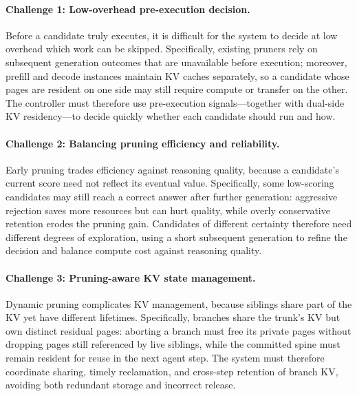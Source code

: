 \paragraph{Challenge 1: Low-overhead pre-execution decision.}
Before a candidate truly executes, it is difficult for the system to decide at low overhead which work can be skipped.
Specifically, existing pruners rely on subsequent generation outcomes that are unavailable before execution; moreover, prefill and decode instances maintain KV caches separately, so a candidate whose pages are resident on one side may still require compute or transfer on the other.
The controller must therefore use pre-execution signals---together with dual-side KV residency---to decide quickly whether each candidate should run and how.

\paragraph{Challenge 2: Balancing pruning efficiency and reliability.}
Early pruning trades efficiency against reasoning quality, because a candidate's current score need not reflect its eventual value.
Specifically, some low-scoring candidates may still reach a correct answer after further generation: aggressive rejection saves more resources but can hurt quality, while overly conservative retention erodes the pruning gain.
Candidates of different certainty therefore need different degrees of exploration, using a short subsequent generation to refine the decision and balance compute cost against reasoning quality.

\paragraph{Challenge 3: Pruning-aware KV state management.}
Dynamic pruning complicates KV management, because siblings share part of the KV yet have different lifetimes.
Specifically, branches share the trunk's KV but own distinct residual pages: aborting a branch must free its private pages without dropping pages still referenced by live siblings, while the committed spine must remain resident for reuse in the next agent step.
The system must therefore coordinate sharing, timely reclamation, and cross-step retention of branch KV, avoiding both redundant storage and incorrect release.

